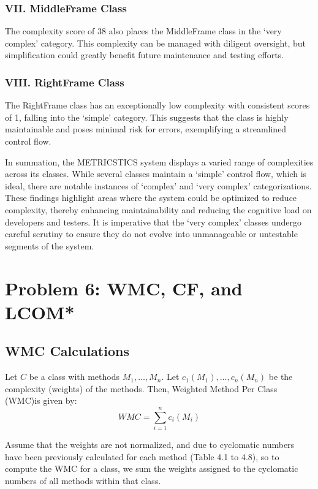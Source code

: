 \documentclass[english,12pt,a4paper]{report}
\begin{document}
	\subsection*{VII. MiddleFrame Class}
	The complexity score of 38 also places the MiddleFrame class in the `very complex' category. This complexity can be managed with diligent oversight, but simplification could greatly benefit future maintenance and testing efforts.
	
	\subsection*{VIII. RightFrame Class}
	The RightFrame class has an exceptionally low complexity with consistent scores of 1, falling into the `simple' category. This suggests that the class is highly maintainable and poses minimal risk for errors, exemplifying a streamlined control flow.
	
	\vspace{10pt}
	In summation, the METRICSTICS system displays a varied range of complexities across its classes. While several classes maintain a `simple' control flow, which is ideal, there are notable instances of `complex' and `very complex' categorizations. These findings highlight areas where the system could be optimized to reduce complexity, thereby enhancing maintainability and reducing the cognitive load on developers and testers. It is imperative that the `very complex' classes undergo careful scrutiny to ensure they do not evolve into unmanageable or untestable segments of the system.
	
	
	\chapter{Problem 6: WMC, CF, and LCOM*}
	\section{WMC Calculations}
	Let $C$ be a class with methods $M_1, \ldots, M_n$. Let $c_1(M_1), \ldots, c_n(M_n)$ be the complexity (weights) of the methods. Then, Weighted Method Per Class (WMC)is given by:
	\begin{equation}
		WMC = \sum_{i=1}^{n} c_i(M_i)
		\tag{Equation 17}
	\end{equation}
	
	Assume that the weights are not normalized, and due to cyclomatic numbers have
	been previously calculated for each method (Table 4.1 to 4.8), so to compute the WMC for a class, we sum the	weights assigned to the cyclomatic numbers of all methods within that class.
\end{document}
